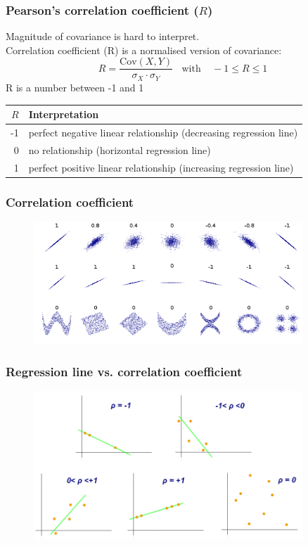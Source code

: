 \documentclass{beamer}
\begin{document}
\begin{frame}
  \frametitle{Pearson's correlation coefficient ($R$)}

  Magnitude of covariance is hard to interpret.\\
  Correlation coefficient (R) is a normalised version of covariance:
\vfill  
  \[R = \frac{\mathrm{Cov}(X,Y)}{\sigma_{X} \cdot \sigma_{Y}} \mathrm{~~~~with~~~~~} -1 \le R \le 1 \]
\vfill  
  R is a number between -1 and 1
\vfill  
  \begin{center}
    \begin{tabular}{rl}
    	$R$ & Interpretation                       \\ \hline
    	-1 & perfect negative linear relationship (decreasing regression line) \\
    	0 & no relationship (horizontal regression line)              \\
    	1 & perfect positive linear relationship (increasing regression line)
    \end{tabular}
  \end{center}

\end{frame}

\begin{frame}
\frametitle{Correlation coefficient}
\begin{figure}
    \centering
    \includegraphics[width=0.90\textwidth]{img/correlationCoef.png}
    \label{fig:les3-regressie}
\end{figure}

\end{frame}

\begin{frame}
\frametitle{Regression line vs. correlation coefficient}
\begin{figure}
    \centering
    \includegraphics[width=0.90\textwidth]{img/les3-regressie.png}
    \label{fig:les3-regressie}
\end{figure}

\end{frame}
\end{document}
